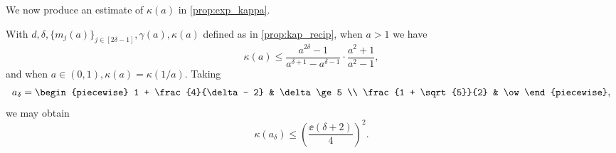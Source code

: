 We now produce an estimate of $\kappa(a)$ in \cref{prop:exp_kappa}.

\begin{proposition} \label{prop:exp_kappa}
  With $d, \delta, \{m_j(a)\}_{j \in [2 \delta - 1]}, \gamma(a), \kappa(a)$ defined as in \cref{prop:kap_recip}, when $a > 1$ we have \begin{equation}\kappa(a) \le \dfrac{a^{2 \delta} - 1}{a^{\delta + 1} - a^{\delta - 1}} \cdot \dfrac{a^2 + 1}{a^2 - 1},\label{eq:kap_est}\end{equation} and when $a \in (0, 1), \kappa(a) = \kappa(1 / a)$.  Taking \[a_\delta = \begin{piecewise} 1 + \frac{4}{\delta - 2} & \delta \ge 5 \\ \frac{1 + \sqrt{5}}{2} & \ow \end{piecewise},\] we may obtain \begin{equation} \kappa(a_\delta) \le \left(\dfrac{\ee (\delta + 2)}{4}\right)^2. \label{eq:kap_opt} \end{equation}
\end{proposition}

